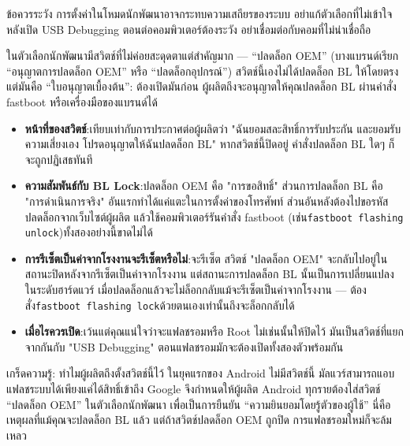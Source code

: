 \begin{tcbwarn}{ข้อควรระวัง}
การตั้งค่าในโหมดนักพัฒนาอาจกระทบความเสถียรของระบบ อย่าแก้ตัวเลือกที่ไม่เข้าใจ หลังเปิด USB Debugging ตอนต่อคอมพิวเตอร์ต้องระวัง อย่าเชื่อมต่อกับคอมที่ไม่น่าเชื่อถือ

\end{tcbwarn}


ในตัวเลือกนักพัฒนามีสวิตช์ที่ไม่ค่อยสะดุดตาแต่สำคัญมาก — “ปลดล็อก OEM” (บางแบรนด์เรียก “อนุญาตการปลดล็อก OEM” หรือ “ปลดล็อกอุปกรณ์”) สวิตช์นี้เองไม่ได้ปลดล็อก BL ให้โดยตรง แต่มันคือ “ใบอนุญาตเบื้องต้น”: ต้องเปิดมันก่อน ผู้ผลิตถึงจะอนุญาตให้คุณปลดล็อก BL ผ่านคำสั่ง fastboot หรือเครื่องมือของแบรนด์ได้

\begin{itemize}
  \item \textbf{หน้าที่ของสวิตช์}:เทียบเท่ากับการประกาศต่อผู้ผลิตว่า "ฉันยอมสละสิทธิ์การรับประกัน และยอมรับความเสี่ยงเอง โปรดอนุญาตให้ฉันปลดล็อก BL" หากสวิตช์นี้ปิดอยู่ คำสั่งปลดล็อก BL ใดๆ ก็จะถูกปฏิเสธทันที
  \item \textbf{ความสัมพันธ์กับ BL Lock}:ปลดล็อก OEM คือ "การขอสิทธิ์" ส่วนการปลดล็อก BL คือ "การดำเนินการจริง" อันแรกทำได้แค่แตะในการตั้งค่าของโทรศัพท์ ส่วนอันหลังต้องไปขอรหัสปลดล็อกจากเว็บไซต์ผู้ผลิต แล้วใช้คอมพิวเตอร์รันคำสั่ง fastboot (เช่น\texttt{fastboot flashing unlock})ทั้งสองอย่างนี้ขาดไม่ได้
  \item \textbf{การรีเซ็ตเป็นค่าจากโรงงานจะรีเซ็ตหรือไม่}:จะรีเซ็ต สวิตช์ "ปลดล็อก OEM" จะกลับไปอยู่ในสถานะปิดหลังจากรีเซ็ตเป็นค่าจากโรงงาน แต่สถานะการปลดล็อก BL นั้นเป็นการเปลี่ยนแปลงในระดับฮาร์ดแวร์ เมื่อปลดล็อกแล้วจะไม่ล็อกกลับแม้จะรีเซ็ตเป็นค่าจากโรงงาน — ต้องสั่ง\texttt{fastboot flashing lock}ด้วยตนเองเท่านั้นถึงจะล็อกกลับได้
  \item \textbf{เมื่อไรควรเปิด}:เว้นแต่คุณแน่ใจว่าจะแฟลชรอมหรือ Root ไม่เช่นนั้นให้ปิดไว้ มันเป็นสวิตช์ที่แยกจากกันกับ "USB Debugging" ตอนแฟลชรอมมักจะต้องเปิดทั้งสองตัวพร้อมกัน
\end{itemize}

\begin{tcbinfo}{เกร็ดความรู้: ทำไมผู้ผลิตถึงตั้งสวิตช์นี้ไว้}
ในยุคแรกของ Android ไม่มีสวิตช์นี้ มัลแวร์สามารถแอบแฟลชระบบได้เพียงแค่ได้สิทธิ์เข้าถึง Google จึงกำหนดให้ผู้ผลิต Android ทุกรายต้องใส่สวิตช์ “ปลดล็อก OEM” ในตัวเลือกนักพัฒนา เพื่อเป็นการยืนยัน “ความยินยอมโดยรู้ตัวของผู้ใช้” นี่คือเหตุผลที่แม้คุณจะปลดล็อก BL แล้ว แต่ถ้าสวิตช์ปลดล็อก OEM ถูกปิด การแฟลชรอมใหม่ก็จะล้มเหลว

\end{tcbinfo}

